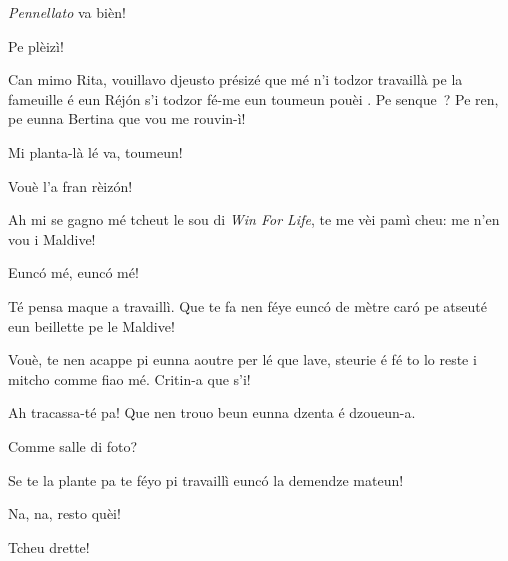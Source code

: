 \begin{drama}
\Eumprezeospeaks \textit{Pennellato} va bièn!

\Ritaspeaks {} Pe plèizì!

\Tobiespeaks Can mimo Rita, vouillavo djeusto présizé que mé n’i todzor travaillà pe la fameuille é eun Réjón s’i todzor fé-me eun toumeun pouèi . Pe senque\ \triste ? Pe ren, pe eunna Bertina que vou me rouvin-ì!

\Eumprezeospeaks Mi planta-là lé va, toumeun!

\Bertinaspeaks Vouè l’a fran rèizón!

\Tobiespeaks  {} Ah mi se gagno mé tcheut le sou di \textit{Win For Life}, te me vèi pamì cheu: me n'en vou i Maldive!

\Simonspeaks Eunc\'o mé, eunc\'o mé!

\Eumprezeospeaks Té pensa maque a travaillì. Que te fa nen féye eunc\'o de mètre caró pe atseuté eun beillette pe le Maldive!

\Bertinaspeaks {} Vouè, te nen acappe pi eunna aoutre per lé que lave, steurie é fé to lo reste i mitcho comme fiao mé. Critin-a que s’i!

\Tobiespeaks Ah tracassa-té pa! Que nen trouo beun eunna dzenta é dzou\-eun-a.

\Simonspeaks Comme salle di foto?

\Eumprezeospeaks Se te la plante pa te féyo pi travaillì eunc\'o la demendze mateun!

\Simonspeaks Na, na, resto quèi!



\Pascalspeaks Tcheu drette!



\end{drama}
